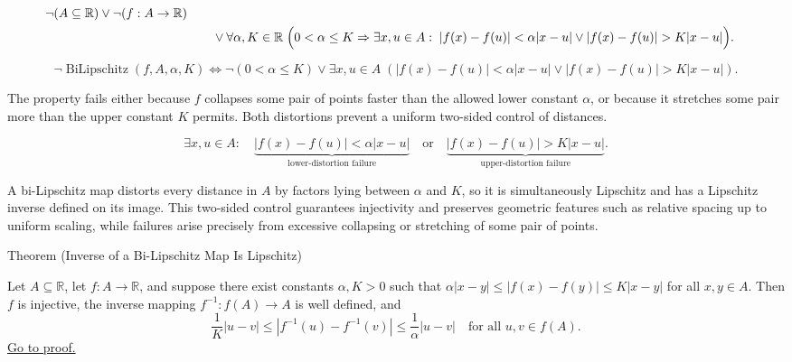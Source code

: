 \begin{remark*}
\[
\begin{aligned}
\neg(A\subseteq\mathbb{R})\lor\neg(f:A\to\mathbb{R})\\
&\qquad\lor
\forall \alpha,K\in\mathbb{R}\;\Bigl(0<\alpha\le K \Rightarrow
\exists x,u\in A:\; |f(x)-f(u)|<\alpha|x-u| \lor |f(x)-f(u)|>K|x-u|\Bigr).
\end{aligned}
\]
\end{remark*}

\begin{remark*}
\[
\neg\operatorname{BiLipschitz}(f,A,\alpha,K) \Longleftrightarrow \neg(0<\alpha\le K) \lor \exists x,u\in A\; \left(|f(x)-f(u)|<\alpha|x-u| \lor |f(x)-f(u)|>K|x-u|\right).
\]
\end{remark*}

\begin{remark*}
The property fails either because $f$ collapses some pair of points faster than the allowed lower constant $\alpha$, or because it stretches some pair more than the upper constant $K$ permits. Both distortions prevent a uniform two-sided control of distances.
\end{remark*}

\begin{remark*}
\[
\exists x,u\in A:\quad
\underbrace{|f(x)-f(u)|<\alpha|x-u|}_{\text{lower-distortion failure}}
\quad\text{or}\quad
\underbrace{|f(x)-f(u)|>K|x-u|}_{\text{upper-distortion failure}}.
\]
\end{remark*}

\begin{remark*}[Interpretation]
A bi-Lipschitz map distorts every distance in $A$ by factors lying between $\alpha$ and $K$, so it is simultaneously Lipschitz and has a Lipschitz inverse defined on its image. This two-sided control guarantees injectivity and preserves geometric features such as relative spacing up to uniform scaling, while failures arise precisely from excessive collapsing or stretching of some pair of points.
\end{remark*}

\NoLocalDependencies

\begin{theorembox}{Theorem (Inverse of a Bi-Lipschitz Map Is Lipschitz)}
\begin{theorem}
\label{thm:bilipschitz-inverse-is-lipschitz}
Let $A \subseteq \mathbb{R}$, let $f:A \to \mathbb{R}$, and suppose there exist constants $\alpha,K>0$ such that
$\alpha |x-y| \le |f(x)-f(y)| \le K |x-y|$ for all $x,y \in A$. Then $f$ is injective, the inverse mapping $f^{-1}:f(A) \to A$ is well defined, and
\[
\frac{1}{K}|u-v| \le |f^{-1}(u)-f^{-1}(v)| \le \frac{1}{\alpha}|u-v|
\quad\text{for all } u,v \in f(A).
\]
\hyperref[prf:bilipschitz-inverse-is-lipschitz]{Go to proof.}
\end{theorem}
\end{theorembox}

